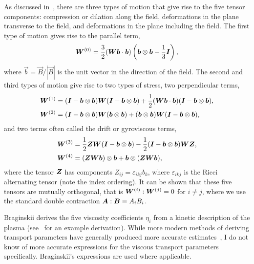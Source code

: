As discussed in~\cite{kaufmanPlasmaViscosityMagnetic1960}, there are three types of motion that give rise to the five tensor components: compression or dilation along the field, deformations in the plane transverse to the field, and deformations in the plane including the field. The first type of motion gives rise to the parallel term,
\begin{equation}
  \label{eq:braginskii_parallel_term}
  {\bm W}^{(0)} = \frac{3}{2}({\bm W}{\bm b}\cdot{\bm b}) \left( {\bm b} \otimes {\bm b} - \frac{1}{3}{\bm I} \right),
\end{equation}
where $\vec{b} = \vec{B}/|\vec{B}|$ is the unit vector in the direction of the field. The second and third types of motion give rise to two types of stress, two perpendicular terms,
\begin{align}
{\bm W}^{(1)} &= ({\bm I} - {\bm b} \otimes {\bm b}){\bm W}({\bm I} - {\bm b} \otimes {\bm b}) + \frac{1}{2}({\bm W}{\bm b} \cdot {\bm b})({\bm I} - {\bm b} \otimes {\bm b}), \\
{\bm W}^{(2)} &= ({\bm I} - {\bm b} \otimes {\bm b}){\bm W}({\bm b} \otimes {\bm b}) + ({\bm b} \otimes {\bm b}){\bm W}({\bm I} - {\bm b} \otimes {\bm b}),  \\
\end{align}
and two terms often called the drift or gyroviscous terms,
\begin{align}
{\bm W}^{(3)} &= \frac{1}{2} {\bm Z}{\bm W}({\bm I} - {\bm b} \otimes {\bm b}) - \frac{1}{2}({\bm I} - {\bm b} \otimes {\bm b}){\bm W}{\bm Z}, \\
{\bm W}^{(4)} &= ({\bm Z}{\bm W}{\bm b}) \otimes {\bm b} + {\bm b} \otimes ({\bm Z} {\bm W} {\bm b}), \\
\label{eq:drift_terms}
\end{align}
where the tensor ${\bm Z}$ has components $Z_{ij} = \varepsilon_{ikj}b_k$, where $\varepsilon_{ikj}$ is the Ricci alternating tensor (note the index ordering). It can be shown that these five tensors are mutually orthogonal, that is ${\bm W}^{(i)}:{\bm W}^{(j)} = 0$ for $i\ne j$, where we use the standard double contraction ${\bm A}:{\bm B} = A_iB_i$.

Braginskii derives the five viscosity coefficients $\eta_i$ from a kinetic description of the plasma (see~\cite{epperleinPlasmaTransportCoefficients1986} for an example derivation). While more modern methods of deriving transport parameters have generally produced more accurate estimates~\cite{epperleinPlasmaTransportCoefficients1986}, I do not know of more accurate expressions for the viscous transport parameters specifically. Braginskii's expressions are used where applicable.

